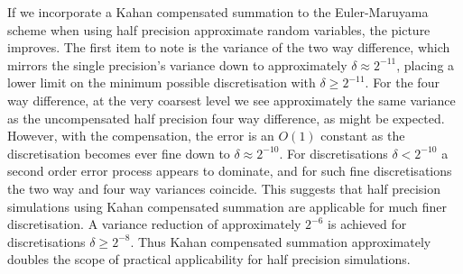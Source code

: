 \documentclass[manuscript,review]{acmart}
\begin{document}
If we incorporate a Kahan compensated summation to the Euler-Maruyama scheme when using half precision approximate random variables, the picture improves. The first item to note is the variance of the two way difference, which mirrors the single precision's variance down to approximately $ \delta \approx  2^{-11} $, placing a lower limit on the minimum possible discretisation with $ \delta \geq 2^{-11} $. For the four way difference, at the very coarsest level we see approximately the same variance as the uncompensated half precision four way difference, as might be expected. However, with the compensation, the error is an $ O(1) $ constant as the discretisation becomes ever fine down to $ \delta \approx 2^{-10} $. For discretisations $ \delta <  2^{-10} $ a second order error process appears to dominate, and for such fine discretisations the two way and four way variances coincide. This suggests that half precision simulations using Kahan compensated summation are applicable for much finer discretisation. A variance reduction of approximately $ 2^{-6} $ is achieved for discretisations $ \delta \geq 2^{-8} $. Thus Kahan compensated summation approximately doubles the scope of practical applicability for half precision simulations. 






\end{document}
